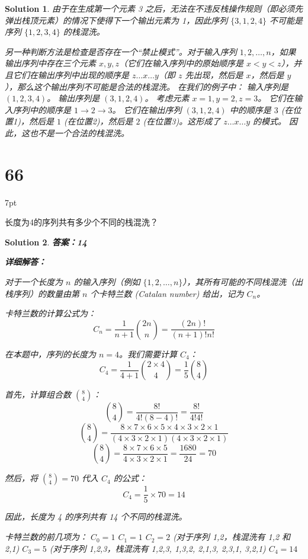 \documentclass[UTF8]{report}
\newtheorem{solution}{Solution}
\theoremstyle{MyLineTheoremStyle} %
\theoremstyle{MyBlockTheoremStyle} %
\theoremstyle{MySubsubsectionStyle} %
\newenvironment{graybox}{%
        \def\FrameCommand{%
        \hspace{1pt}%
        {\color{gray}\small \vrule width 2pt}%
        {\color{graybox_color}\vrule width 4pt}%
        \colorbox{graybox_color}%
        }%
        \MakeFramed{\advance\hsize-\width\FrameRestore}%
        \noindent\hspace{-4.55pt}%
        \begin{adjustwidth}{}{7pt}%
        \vspace{2pt}\vspace{2pt}%
        }
        {%
        \vspace{2pt}\end{adjustwidth}\endMakeFramed%
        }
\begin{document}
\begin{solution}
由于在生成第一个元素 3 之后，无法在不违反栈操作规则（即必须先弹出栈顶元素）的情况下使得下一个输出元素为 1，因此序列 $\{3,1,2,4\}$ 不可能是序列 $\{1,2,3,4\}$ 的栈混洗。

另一种判断方法是检查是否存在一个“禁止模式”。对于输入序列 $1, 2, \ldots, n$，如果输出序列中存在三个元素 $x, y, z$（它们在输入序列中的原始顺序是 $x < y < z$），并且它们在输出序列中出现的顺序是 $z \ldots x \ldots y$（即 $z$ 先出现，然后是 $x$，然后是 $y$），那么这个输出序列不可能是合法的栈混洗。
在我们的例子中：
输入序列是 $(1,2,3,4)$。
输出序列是 $(3,1,2,4)$。
考虑元素 $x=1, y=2, z=3$。
它们在输入序列中的顺序是 $1 \rightarrow 2 \rightarrow 3$。
它们在输出序列 $(3,1,2,4)$ 中的顺序是 $3$ (在位置1)，然后是 $1$ (在位置2)，然后是 $2$ (在位置3)。这形成了 $z \ldots x \ldots y$ 的模式。
因此，这也不是一个合法的栈混洗。

\end{solution}


\section*{66}
\begin{graybox}
长度为4的序列共有多少个不同的栈混洗？
\end{graybox}

\begin{solution}
\textbf{答案：14}

\textbf{详细解答：}

对于一个长度为 $n$ 的输入序列（例如 $\{1, 2, \ldots, n\}$），其所有可能的不同栈混洗（出栈序列）的数量由第 $n$ 个卡特兰数 (Catalan number) 给出，记为 $C_n$。

卡特兰数的计算公式为：
$$C_n = \frac{1}{n+1} \binom{2n}{n} = \frac{(2n)!}{(n+1)!n!}$$

在本题中，序列的长度为 $n=4$。我们需要计算 $C_4$：
$$C_4 = \frac{1}{4+1} \binom{2 \times 4}{4} = \frac{1}{5} \binom{8}{4}$$

首先，计算组合数 $\binom{8}{4}$：
$$ \binom{8}{4} = \frac{8!}{4!(8-4)!} = \frac{8!}{4!4!} $$
$$ \binom{8}{4} = \frac{8 \times 7 \times 6 \times 5 \times 4 \times 3 \times 2 \times 1}{(4 \times 3 \times 2 \times 1)(4 \times 3 \times 2 \times 1)} $$
$$ \binom{8}{4} = \frac{8 \times 7 \times 6 \times 5}{4 \times 3 \times 2 \times 1} = \frac{1680}{24} = 70 $$

然后，将 $\binom{8}{4} = 70$ 代入 $C_4$ 的公式：
$$ C_4 = \frac{1}{5} \times 70 = 14 $$

因此，长度为 4 的序列共有 14 个不同的栈混洗。

卡特兰数的前几项为：
$C_0 = 1$
$C_1 = 1$
$C_2 = 2$ (对于序列 {1,2}，栈混洗有 {1,2} 和 {2,1})
$C_3 = 5$ (对于序列 {1,2,3}，栈混洗有 {1,2,3}, {1,3,2}, {2,1,3}, {2,3,1}, {3,2,1})
$C_4 = 14$

\end{solution}
\end{document}
